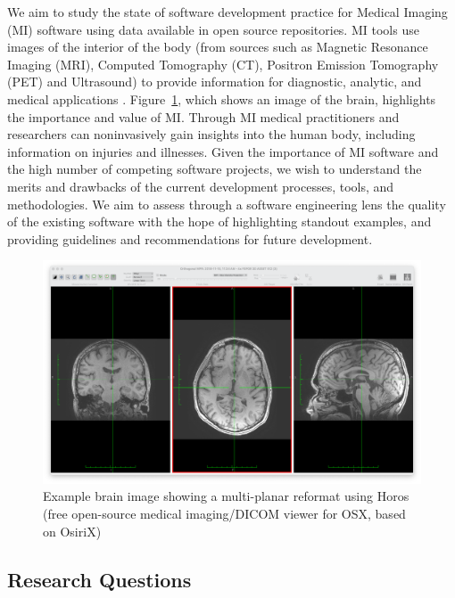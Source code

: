 \documentclass[11pt]{article}
\begin{document}
We aim to study the state of software development practice for Medical Imaging
(MI) software using data available in open source repositories.  MI tools use
images of the interior of the body (from sources such as Magnetic Resonance
Imaging (MRI), Computed Tomography (CT), Positron Emission Tomography (PET) and
Ultrasound) to provide information for diagnostic, analytic, and medical
applications \citep{FDA2021, enwiki:1034887445, Zhang2008}.
Figure~\ref{Fig_Example}, which shows an image of the brain, highlights the
importance and value of MI. Through MI medical practitioners and researchers can
noninvasively gain insights into the human body, including information on
injuries and illnesses. Given the importance of MI software and the high number
of competing software projects, we wish to understand the merits and drawbacks
of the current development processes, tools, and methodologies. We aim to assess
through a software engineering lens the quality of the existing software with
the hope of highlighting standout examples, and providing guidelines and
recommendations for future development.

\begin{figure}[!ht]
    \begin{center}
        \includegraphics[scale=0.25]{MPR.png}        
    \end{center}
    \caption{Example brain image showing a multi-planar reformat using Horos
	(free open-source medical imaging/DICOM viewer for OSX, based on OsiriX)}
    \label{Fig_Example}
\end{figure}

\subsection{Research Questions} \label{sec_motivation}
\end{document}
